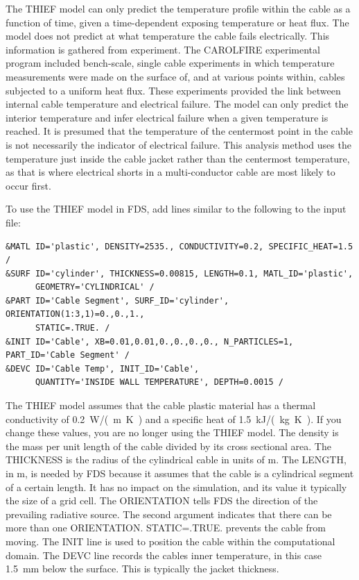 \documentclass[11pt]{book}
\begin{document}
The THIEF model can only predict the temperature profile within the cable as a function of time,
given a time-dependent exposing temperature or heat flux. The model does not predict at what
temperature the cable fails electrically. This information is gathered from experiment. The
CAROLFIRE experimental program included bench-scale, single cable experiments in which
temperature measurements were made on the surface of, and at various points within, cables
subjected to a uniform heat flux. These experiments provided the link between internal cable
temperature and electrical failure. The model can only predict the interior temperature and infer
electrical failure when a given temperature is reached. It is presumed that the
temperature of the centermost point in the cable is not necessarily the indicator of electrical
failure. This analysis method uses the temperature just inside the cable jacket rather than the
centermost temperature, as that is where electrical shorts in a multi-conductor cable are most
likely to occur first.

To use the THIEF model in FDS, add lines similar to the following to the input file:
\begin{lstlisting}
&MATL ID='plastic', DENSITY=2535., CONDUCTIVITY=0.2, SPECIFIC_HEAT=1.5 /
&SURF ID='cylinder', THICKNESS=0.00815, LENGTH=0.1, MATL_ID='plastic',
      GEOMETRY='CYLINDRICAL' /
&PART ID='Cable Segment', SURF_ID='cylinder', ORIENTATION(1:3,1)=0.,0.,1.,
      STATIC=.TRUE. /
&INIT ID='Cable', XB=0.01,0.01,0.,0.,0.,0., N_PARTICLES=1, PART_ID='Cable Segment' /
&DEVC ID='Cable Temp', INIT_ID='Cable',
      QUANTITY='INSIDE WALL TEMPERATURE', DEPTH=0.0015 /
\end{lstlisting}
The THIEF model assumes that the cable plastic material has a thermal conductivity of 0.2~\si{W/(m.K)} and a specific heat of 1.5~\si{kJ/(kg.K)}. If you change these values, you are no longer using the THIEF model. The density is the mass per unit length of the cable divided by its cross sectional area. The {\ct THICKNESS} is the radius of the cylindrical cable in units of m. The {\ct LENGTH}, in m, is needed by FDS because it assumes that the cable is a cylindrical segment of a certain length. It has no impact on the simulation, and its value it typically the size of a grid cell. The {\ct ORIENTATION} tells FDS the direction of the prevailing radiative source. The second argument indicates that there can be more than one {\ct ORIENTATION}. {\ct STATIC=.TRUE.} prevents the cable from moving. The {\ct INIT} line is used to position the cable within the computational domain. The {\ct DEVC} line records the cables inner temperature, in this case 1.5~mm below the surface. This is typically the jacket thickness.
\end{document}
